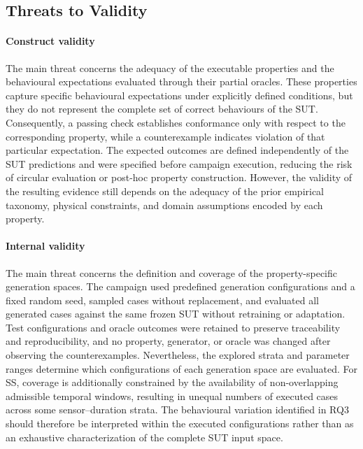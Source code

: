 \documentclass[preprint,12pt]{elsarticle}
\begin{document}
\subsection{Threats to Validity}
\label{sec:threats_validity}

\paragraph{Construct validity}
The main threat concerns the adequacy of the executable properties and the
behavioural expectations evaluated through their partial oracles. These
properties capture specific behavioural expectations under explicitly
defined conditions, but they do not represent the complete set of correct
behaviours of the SUT. Consequently, a passing check establishes conformance
only with respect to the corresponding property, while a counterexample
indicates violation of that particular expectation. The expected outcomes
are defined independently of the SUT predictions and were specified before
campaign execution, reducing the risk of circular evaluation or post-hoc
property construction. However, the validity of the resulting evidence still
depends on the adequacy of the prior empirical taxonomy, physical constraints,
and domain assumptions encoded by each property.

\paragraph{Internal validity}
The main threat concerns the definition and coverage of the
property-specific generation spaces. The campaign used predefined generation
configurations and a fixed random seed, sampled cases without replacement,
and evaluated all generated cases against the same frozen SUT without
retraining or adaptation. Test configurations and oracle outcomes were
retained to preserve traceability and reproducibility, and no property,
generator, or oracle was changed after observing the counterexamples.
Nevertheless, the explored strata and parameter ranges determine which
configurations of each generation space are evaluated. For SS, coverage is
additionally constrained by the availability of non-overlapping admissible
temporal windows, resulting in unequal numbers of executed cases across some
sensor--duration strata. The behavioural variation identified in RQ3 should
therefore be interpreted within the executed configurations rather than as
an exhaustive characterization of the complete SUT input space.
\end{document}
